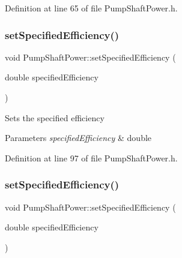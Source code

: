 Definition at line 65 of file Pump\+Shaft\+Power.\+h.

\mbox{\label{class_pump_shaft_power_a7d2c64ba11fb287d9b46f7d0890ee988}} 
\subsubsection{\texorpdfstring{set\+Specified\+Efficiency()}{setSpecifiedEfficiency()}\hspace{0.1cm}{\footnotesize\ttfamily [1/3]}}
{\footnotesize\ttfamily void Pump\+Shaft\+Power\+::set\+Specified\+Efficiency (\begin{DoxyParamCaption}\item[{double}]{specified\+Efficiency }\end{DoxyParamCaption})\hspace{0.3cm}{\ttfamily [inline]}}

Sets the specified efficiency 
\begin{DoxyParams}{Parameters}
{\em specified\+Efficiency} & double \\
\hline
\end{DoxyParams}


Definition at line 97 of file Pump\+Shaft\+Power.\+h.

\mbox{\label{class_pump_shaft_power_a7d2c64ba11fb287d9b46f7d0890ee988}} 
\subsubsection{\texorpdfstring{set\+Specified\+Efficiency()}{setSpecifiedEfficiency()}\hspace{0.1cm}{\footnotesize\ttfamily [2/3]}}
{\footnotesize\ttfamily void Pump\+Shaft\+Power\+::set\+Specified\+Efficiency (\begin{DoxyParamCaption}\item[{double}]{specified\+Efficiency }\end{DoxyParamCaption})\hspace{0.3cm}{\ttfamily [inline]}}


